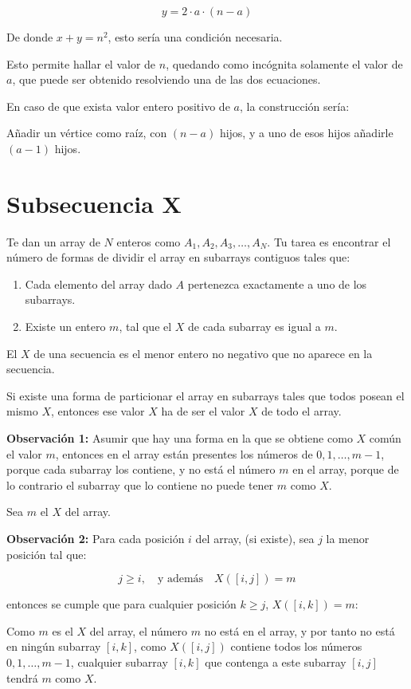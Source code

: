 \documentclass[14pt]{extarticle}
\begin{document}
\[
y = 2 \cdot a \cdot (n - a)
\]

De donde $x + y = n^2$, esto sería una condición necesaria.

Esto permite hallar el valor de $n$, quedando como incógnita solamente el valor de $a$, que puede ser obtenido resolviendo una de las dos ecuaciones.

En caso de que exista valor entero positivo de $a$, la construcción sería:

Añadir un vértice como raíz, con $(n-a)$ hijos, y a uno de esos hijos añadirle $(a -1)$ hijos.

\section*{Subsecuencia X}

Te dan un array de $N$ enteros como $A_1, A_2, A_3, \dots, A_N$. Tu tarea es encontrar el número de formas de dividir el array en subarrays contiguos tales que:

\begin{enumerate}
    \item Cada elemento del array dado $A$ pertenezca exactamente a uno de los subarrays.
    \item Existe un entero $m$, tal que el $X$ de cada subarray es igual a $m$.
\end{enumerate}

El $X$ de una secuencia es el menor entero no negativo que no aparece en la secuencia.


Si existe una forma de particionar el array en subarrays tales que todos posean el mismo $X$, entonces ese valor $X$ ha de ser el valor $X$ de todo el array.

\textbf{Observación 1:}
Asumir que hay una forma en la que se obtiene como $X$ común el valor $m$, entonces en el array están presentes los números de $0, 1, \ldots, m-1$, porque cada subarray los contiene, y no está el número $m$ en el array, porque de lo contrario el subarray que lo contiene no puede tener $m$ como $X$.

Sea $m$ el $X$ del array.

\textbf{Observación 2:}
Para cada posición $i$ del array, (si existe), sea $j$ la menor posición tal que:

\[
j \geq i, \quad \text{y además} \quad X([i, j]) = m
\]

entonces se cumple que para cualquier posición $k \geq j$, $X([i, k]) = m$:

Como $m$ es el $X$ del array, el número $m$ no está en el array, y por tanto no está en ningún subarray $[i, k]$, como $X([i, j])$ contiene todos los números $0, 1, \ldots, m-1$, cualquier subarray $[i, k]$ que contenga a este subarray $[i, j]$ tendrá $m$ como $X$.
\end{document}
